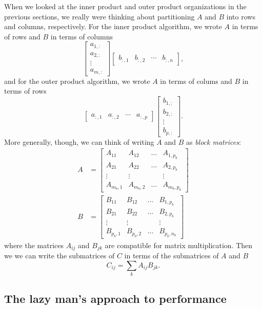 \documentclass[12pt, leqno]{article} %
\begin{document}
When we looked at the inner product and outer product organizations
in the previous sections, we really were thinking about partitioning
$A$ and $B$ into rows and columns, respectively.  For the inner product
algorithm, we wrote $A$ in terms of rows and $B$ in terms of columns
\[
  \begin{bmatrix} a_{1,:} \\ a_{2,:} \\ \vdots \\ a_{m,:} \end{bmatrix}
  \begin{bmatrix} b_{:,1} & b_{:,2} & \cdots & b_{:,n} \end{bmatrix},
\]
and for the outer product algorithm, we wrote $A$ in terms of colums
and $B$ in terms of rows
\[
  \begin{bmatrix} a_{:,1} & a_{:,2} & \cdots & a_{:,p} \end{bmatrix}
  \begin{bmatrix} b_{1,:} \\ b_{2,:} \\ \vdots \\ b_{p,:} \end{bmatrix}.
\]
More generally, though, we can think of writing $A$ and $B$ as
{\em block matrices}:
\begin{align*}
  A &=
  \begin{bmatrix}
    A_{11} & A_{12} & \ldots & A_{1,p_b} \\
    A_{21} & A_{22} & \ldots & A_{2,p_b} \\
    \vdots & \vdots &       & \vdots \\
    A_{m_b,1} & A_{m_b,2} & \ldots & A_{m_b,p_b}
  \end{bmatrix} \\
  B &=
  \begin{bmatrix}
    B_{11} & B_{12} & \ldots & B_{1,p_b} \\
    B_{21} & B_{22} & \ldots & B_{2,p_b} \\
    \vdots & \vdots &       & \vdots \\
    B_{p_b,1} & B_{p_b,2} & \ldots & B_{p_b,n_b}
  \end{bmatrix}
\end{align*}
where the matrices $A_{ij}$ and $B_{jk}$ are compatible for matrix
multiplication.  Then we we can write the submatrices of $C$ in terms
of the submatrices of $A$ and $B$
\[
  C_{ij} = \sum_k A_{ij} B_{jk}.
\]

\subsection{The lazy man's approach to performance}
\end{document}
